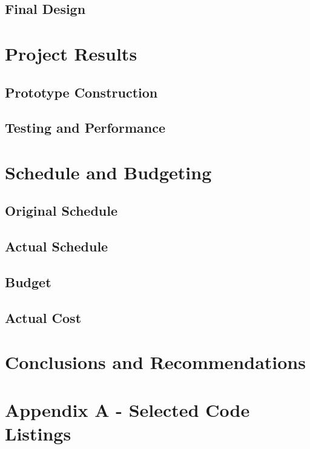 \documentclass[oneside,final,a4paper]{report}
\begin{document}
\section{Final Design}


\chapter{Project Results}

\section{Prototype Construction}

\section{Testing and Performance}

\chapter{Schedule and Budgeting}

\section{Original Schedule}

\section{Actual Schedule}

\section{Budget}

\section{Actual Cost}


\chapter{Conclusions and Recommendations}

\chapter*{Appendix A - Selected Code Listings}
\end{document}
